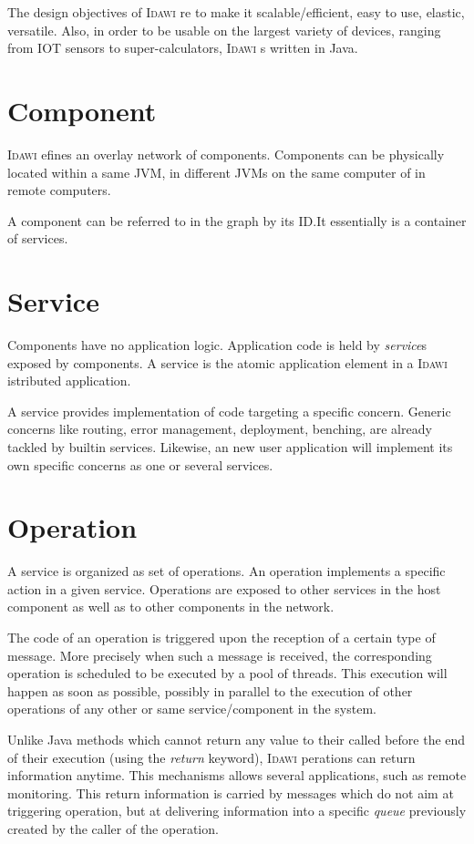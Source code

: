 \documentclass{article}
\newcommand{\idawi}[1]{\textsc{Idawi}\xspace}
\begin{document}
The design objectives of \idawi are to make it scalable/efficient, easy to use, elastic, versatile. Also, in order to be usable on the largest variety of devices, ranging from IOT sensors to super-calculators, \idawi is written in Java.


\section{Component}
\idawi defines an overlay network of components. Components can be physically located within a same JVM, in different JVMs on the same computer of in remote computers.


A component can be referred to in the graph by its ID.It essentially is a container of services.




\section{Service}
Components have no application logic. Application code is held by \textit{service}s exposed by components. A service is the atomic application element in a \idawi distributed application.

A service provides implementation of code targeting a specific concern.
Generic concerns like routing, error management, deployment, benching, are already tackled by builtin services. Likewise, an new user application will implement its own specific concerns as one or several services.

\section{Operation}

A service is organized as set of operations. An operation implements a specific action in a given service. Operations are exposed to other services in the host component as well as to other components in the network.

The code of an operation is triggered upon the reception of a certain type of message. More precisely when such a message is received, the corresponding  operation is scheduled to be executed by a pool of threads. This execution will happen as soon as possible, possibly in parallel to the execution of other operations of any other or same service/component in the system.

Unlike Java methods which cannot return any value to their called before the end of their execution (using the {\em return} keyword), \idawi operations can return information anytime. This mechanisms allows several applications, such as remote monitoring. This return information is carried by messages which do not aim at  triggering operation, but at delivering information into a  specific {\em queue} previously created by the caller of the operation.
\end{document}
